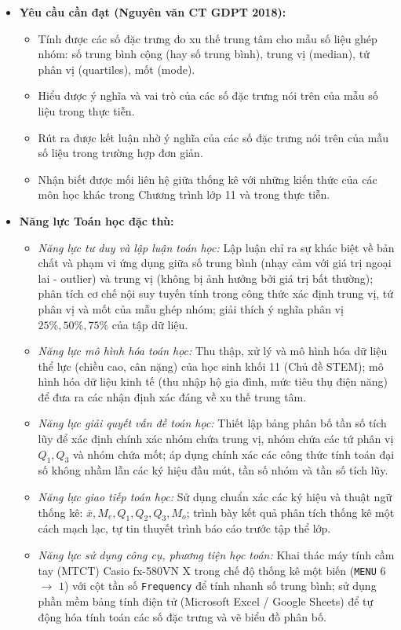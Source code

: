 \documentclass[12pt, a4paper]{article}
\begin{document}
\begin{itemize}[leftmargin=1.2cm]
    \item \textbf{Yêu cầu cần đạt (Nguyên văn CT GDPT 2018):}
    \begin{itemize}[leftmargin=0.6cm]
        \item Tính được các số đặc trưng đo xu thế trung tâm cho mẫu số liệu ghép nhóm: số trung bình cộng (hay số trung bình), trung vị (median), tứ phân vị (quartiles), mốt (mode).
        \item Hiểu được ý nghĩa và vai trò của các số đặc trưng nói trên của mẫu số liệu trong thực tiễn.
        \item Rút ra được kết luận nhờ ý nghĩa của các số đặc trưng nói trên của mẫu số liệu trong trường hợp đơn giản.
        \item Nhận biết được mối liên hệ giữa thống kê với những kiến thức của các môn học khác trong Chương trình lớp 11 và trong thực tiễn.
    \end{itemize}

    \item \textbf{Năng lực Toán học đặc thù:}
    \begin{itemize}[leftmargin=0.6cm]
        \item \textit{Năng lực tư duy và lập luận toán học:} Lập luận chỉ ra sự khác biệt về bản chất và phạm vi ứng dụng giữa số trung bình (nhạy cảm với giá trị ngoại lai - outlier) và trung vị (không bị ảnh hưởng bởi giá trị bất thường); phân tích cơ chế nội suy tuyến tính trong công thức xác định trung vị, tứ phân vị và mốt của mẫu ghép nhóm; giải thích ý nghĩa phân vị $25\%, 50\%, 75\%$ của tập dữ liệu.
        \item \textit{Năng lực mô hình hóa toán học:} Thu thập, xử lý và mô hình hóa dữ liệu thể lực (chiều cao, cân nặng) của học sinh khối 11 (Chủ đề STEM); mô hình hóa dữ liệu kinh tế (thu nhập hộ gia đình, mức tiêu thụ điện năng) để đưa ra các nhận định xác đáng về xu thế trung tâm.
        \item \textit{Năng lực giải quyết vấn đề toán học:} Thiết lập bảng phân bố tần số tích lũy để xác định chính xác nhóm chứa trung vị, nhóm chứa các tứ phân vị $Q_1, Q_3$ và nhóm chứa mốt; áp dụng chính xác các công thức tính toán đại số không nhầm lẫn các ký hiệu đầu mút, tần số nhóm và tần số tích lũy.
        \item \textit{Năng lực giao tiếp toán học:} Sử dụng chuẩn xác các ký hiệu và thuật ngữ thống kê: $\bar{x}, M_e, Q_1, Q_2, Q_3, M_o$; trình bày kết quả phân tích thống kê một cách mạch lạc, tự tin thuyết trình báo cáo trước tập thể lớp.
        \item \textit{Năng lực sử dụng công cụ, phương tiện học toán:} Khai thác máy tính cầm tay (MTCT) Casio fx-580VN X trong chế độ thống kê một biến (\texttt{MENU} $6$ $\to$ $1$) với cột tần số \texttt{Frequency} để tính nhanh số trung bình; sử dụng phần mềm bảng tính điện tử (Microsoft Excel / Google Sheets) để tự động hóa tính toán các số đặc trưng và vẽ biểu đồ phân bố.
    \end{itemize}


\end{itemize}
\end{document}
